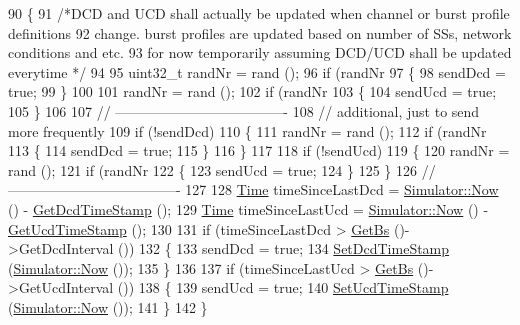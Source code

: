 \begin{DoxyCode}
90 \{
91   \textcolor{comment}{/*DCD and UCD shall actually be updated when channel or burst profile definitions}
92 \textcolor{comment}{   change. burst profiles are updated based on number of SSs, network conditions and etc.}
93 \textcolor{comment}{   for now temporarily assuming DCD/UCD shall be updated everytime */}
94 
95   uint32\_t randNr = rand ();
96   \textcolor{keywordflow}{if} (randNr %
97     \{
98       sendDcd = \textcolor{keyword}{true};
99     \}
100 
101   randNr = rand ();
102   \textcolor{keywordflow}{if} (randNr %
103     \{
104       sendUcd = \textcolor{keyword}{true};
105     \}
106 
107   \textcolor{comment}{// -------------------------------------}
108   \textcolor{comment}{// additional, just to send more frequently}
109   \textcolor{keywordflow}{if} (!sendDcd)
110     \{
111       randNr = rand ();
112       \textcolor{keywordflow}{if} (randNr %
113         \{
114           sendDcd = \textcolor{keyword}{true};
115         \}
116     \}
117 
118   \textcolor{keywordflow}{if} (!sendUcd)
119     \{
120       randNr = rand ();
121       \textcolor{keywordflow}{if} (randNr %
122         \{
123           sendUcd = \textcolor{keyword}{true};
124         \}
125     \}
126   \textcolor{comment}{// -------------------------------------}
127 
128   \hyperlink{namespacens3_1_1TracedValueCallback_a7ffd3e7c142ffe7c8a1d2db9b8de38ec}{Time} timeSinceLastDcd = \hyperlink{classns3_1_1Simulator_ac3178fa975b419f7875e7105be122800}{Simulator::Now} () - \hyperlink{classns3_1_1UplinkScheduler_a3db19e92a24c71af7d6aff5e94d488fe}{GetDcdTimeStamp} ();
129   \hyperlink{namespacens3_1_1TracedValueCallback_a7ffd3e7c142ffe7c8a1d2db9b8de38ec}{Time} timeSinceLastUcd = \hyperlink{classns3_1_1Simulator_ac3178fa975b419f7875e7105be122800}{Simulator::Now} () - \hyperlink{classns3_1_1UplinkScheduler_a709e1a0e3c5ab174b0e1bc123dcfd676}{GetUcdTimeStamp} ();
130 
131   \textcolor{keywordflow}{if} (timeSinceLastDcd > \hyperlink{classns3_1_1UplinkScheduler_afe61b7de71d92d2dff1b135744a6ff7e}{GetBs} ()->GetDcdInterval ())
132     \{
133       sendDcd = \textcolor{keyword}{true};
134       \hyperlink{classns3_1_1UplinkScheduler_a18ccfd91b3f58a55f7249bbafb858f5c}{SetDcdTimeStamp} (\hyperlink{classns3_1_1Simulator_ac3178fa975b419f7875e7105be122800}{Simulator::Now} ());
135     \}
136 
137   \textcolor{keywordflow}{if} (timeSinceLastUcd > \hyperlink{classns3_1_1UplinkScheduler_afe61b7de71d92d2dff1b135744a6ff7e}{GetBs} ()->GetUcdInterval ())
138     \{
139       sendUcd = \textcolor{keyword}{true};
140       \hyperlink{classns3_1_1UplinkScheduler_a0dff82b69865688622c0453a35bffe98}{SetUcdTimeStamp} (\hyperlink{classns3_1_1Simulator_ac3178fa975b419f7875e7105be122800}{Simulator::Now} ());
141     \}
142 \}
\end{DoxyCode}


